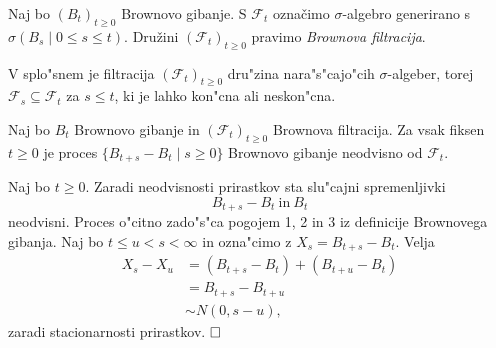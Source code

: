 \documentclass[twoside,11pt]{article}
\begin{document}
%



\begin{definicija}
    Naj bo $(B_t)_{t\geq 0}$ Brownovo gibanje. S $\mathcal{F}_t$ 
    označimo $\sigma$-algebro generirano s $\sigma(B_s \mid 0\leq s \leq t)$. 
    Družini $(\mathcal{F}_t)_{t\geq 0}$ pravimo \textit{Brownova filtracija}.
\end{definicija}

\begin{opomba}
    V splo"snem je filtracija $(\mathcal{F}_t)_{t\geq0}$ dru"zina nara"s"cajo"cih $\sigma$-algeber, torej $\mathcal{F}_s \subseteq \mathcal{F}_t$ za $s \leq t$, ki je lahko kon"cna ali neskon"cna.
\end{opomba}
 

\begin{izrek}
    Naj bo $B_t$ Brownovo gibanje in $(\mathcal{F}_t)_{t\geq 0}$ Brownova filtracija. Za vsak fiksen $t \geq 0$  je proces $\{B_{t+s}-B_t\mid s\geq 0\}$ Brownovo gibanje neodvisno od $\mathcal{F}_t$.
\end{izrek}

\begin{dokaz}
    Naj bo $t \geq 0$. Zaradi neodvisnosti prirastkov sta slu"cajni spremenljivki 
    $$
    B_{t+s}-B_t \ \text{in} \ B_t
    $$
    neodvisni. Proces o"citno zado"s"ca pogojem 1, 2 in 3 iz definicije Brownovega gibanja. Naj bo $t \leq u < s < \infty$ in ozna"cimo z $X_s = B_{t+s}-B_t$. Velja
    \begin{align*}
        X_s - X_u &= (B_{t + s} - B_t) + (B_{t + u} - B_t) \\        
                  &= B_{t + s} - B_{t + u} \\
                  &\sim N(0, s-u), 
    \end{align*}
    zaradi stacionarnosti prirastkov.
    $\hfill \square$
\end{dokaz}
\end{document}
